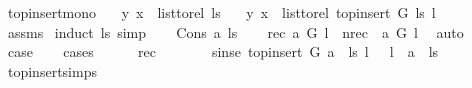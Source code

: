 \begin{isabellebody}
\isanewline
\isanewline
{}\isamarkupfalse%
\ top{\isacharunderscore}{\kern0pt}insert{\isacharunderscore}{\kern0pt}mono{\isacharcolon}{\kern0pt}\isanewline
\ \ \ {\isachardoublequoteopen}{\isacharparenleft}{\kern0pt}y{\isacharcomma}{\kern0pt}\ x{\isacharparenright}{\kern0pt}\ {\isasymin}\ list{\isacharunderscore}{\kern0pt}to{\isacharunderscore}{\kern0pt}rel\ ls{\isachardoublequoteclose}\isanewline
\ \ \ {\isachardoublequoteopen}{\isacharparenleft}{\kern0pt}y{\isacharcomma}{\kern0pt}\ x{\isacharparenright}{\kern0pt}\ {\isasymin}\ list{\isacharunderscore}{\kern0pt}to{\isacharunderscore}{\kern0pt}rel\ {\isacharparenleft}{\kern0pt}top{\isacharunderscore}{\kern0pt}insert\ G\ ls\ l{\isacharparenright}{\kern0pt}{\isachardoublequoteclose}\isanewline
%
\isadelimproof
\ \ %
\endisadelimproof
%
\isatagproof
{}\isamarkupfalse%
\ assms\ \isanewline
{}\isamarkupfalse%
{\isacharparenleft}{\kern0pt}induct\ ls{\isacharcomma}{\kern0pt}\ simp{\isacharparenright}{\kern0pt}\isanewline
\ \ \isamarkupfalse%
\ {\isacharparenleft}{\kern0pt}Cons\ a\ ls{\isacharparenright}{\kern0pt}\isanewline
\ \ \isamarkupfalse%
\ {\isacharparenleft}{\kern0pt}rec{\isacharparenright}{\kern0pt}\ {\isachardoublequoteopen}a\ {\isasymrightarrow}\isactrlsup {\isacharplus}{\kern0pt}\isactrlbsub G\isactrlesub \ l{\isachardoublequoteclose}\ {\isacharbar}{\kern0pt}\ {\isacharparenleft}{\kern0pt}nrec{\isacharparenright}{\kern0pt}\ {\isachardoublequoteopen}{\isasymnot}\ a\ {\isasymrightarrow}\isactrlsup {\isacharplus}{\kern0pt}\isactrlbsub G\isactrlesub \ l{\isachardoublequoteclose}\ \isamarkupfalse%
\ auto\isanewline
\ \ \isamarkupfalse%
\ \isamarkupfalse%
\ {\isacharquery}{\kern0pt}case\ \isanewline
\ \ \isamarkupfalse%
{\isacharparenleft}{\kern0pt}cases{\isacharparenright}{\kern0pt}\isanewline
\ \ \ \ \isamarkupfalse%
\ rec\isanewline
\ \ \ \ \isamarkupfalse%
\ \isamarkupfalse%
\ sinse{\isacharcolon}{\kern0pt}\ {\isachardoublequoteopen}{\isacharparenleft}{\kern0pt}top{\isacharunderscore}{\kern0pt}insert\ G\ {\isacharparenleft}{\kern0pt}a\ {\isacharhash}{\kern0pt}\ ls{\isacharparenright}{\kern0pt}\ l{\isacharparenright}{\kern0pt}\ \ {\isacharequal}{\kern0pt}\ l\ {\isacharhash}{\kern0pt}\ a\ {\isacharhash}{\kern0pt}\ ls{\isachardoublequoteclose}\isanewline
\ \ \ \ \ \ \isamarkupfalse%
\ top{\isacharunderscore}{\kern0pt}insert{\isachardot}{\kern0pt}simps\ \isamarkupfalse%

\end{isabellebody}
